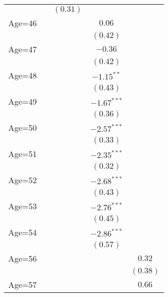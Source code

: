 \documentclass[fullpage]{paper}
\begin{document}
\begin{center}
\begin{longtable}{l c c c c }
            &               & $(0.31)$      &               &               \\
Age=46      &               &               & $0.06$        &               \\
            &               &               & $(0.42)$      &               \\
Age=47      &               &               & $-0.36$       &               \\
            &               &               & $(0.42)$      &               \\
Age=48      &               &               & $-1.15^{**}$  &               \\
            &               &               & $(0.43)$      &               \\
Age=49      &               &               & $-1.67^{***}$ &               \\
            &               &               & $(0.36)$      &               \\
Age=50      &               &               & $-2.57^{***}$ &               \\
            &               &               & $(0.33)$      &               \\
Age=51      &               &               & $-2.35^{***}$ &               \\
            &               &               & $(0.32)$      &               \\
Age=52      &               &               & $-2.68^{***}$ &               \\
            &               &               & $(0.43)$      &               \\
Age=53      &               &               & $-2.76^{***}$ &               \\
            &               &               & $(0.45)$      &               \\
Age=54      &               &               & $-2.86^{***}$ &               \\
            &               &               & $(0.57)$      &               \\
Age=56      &               &               &               & $0.32$        \\
            &               &               &               & $(0.38)$      \\
Age=57      &               &               &               & $0.66$        \\

\end{longtable}
\end{center}
\end{document}
